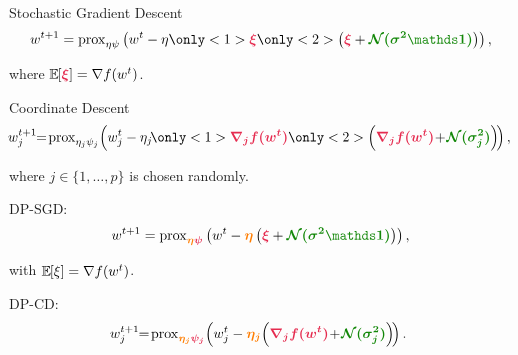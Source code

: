 \documentclass{beamer}
\begin{document}
\begin{frame}
  \vspace{2em}

  Stochastic Gradient Descent
  \begin{align*}
    w^{t+1} = \prox_{\eta\psi}\left(w^t - \eta
    \only<1>{\emphcol{\xi}}
    \only<2>{\left( \emphcol{\xi} + \emphcolb{\cN(\sigma^2\bbI)} \right)}\right),
  \end{align*}

  where $\expec{}{\emphcol{\xi}} = \nabla f(w^t)$.

  \vspace{-0.5em}
\end{frame}


\begin{frame}
  \vspace{2em}

  Coordinate Descent
  \begin{align*}
    \!w^{t+1}_{j}\!\! =\!
    \prox_{\eta_j\psi_j}\!
    \left(w^t_{j} - \eta_{j}\!
    \only<1>{ \emphcol{\nabla_{j} f(w^t)} }
    \only<2>{ \left( \emphcol{\nabla_{j} f(w^t)}
    \!+\! \emphcolb{\cN(\sigma_{j}^2)} \right) \! }\right),
  \end{align*}

  \vspace{1.5em}

  \begin{flushright}
    where $j \in \{1, \dots, p\}$ is chosen randomly.
  \end{flushright}

\end{frame}

\begin{frame}
  DP-SGD:
  \begin{align*}
    w^{t+1} = \prox_{\emphcolc{\eta}\emphcol{\psi}}\left(w^t - \emphcolc{\eta} \left( \emphcol{\xi}
    + \emphcolb{\cN(\sigma^2\bbI)} \right)\right),
  \end{align*}

  \begin{flushright}
    with $\mathbb E_{} \hspace{-0.29em} \left[ \xi \right] = \nabla f(w^t)$.
  \end{flushright}

  DP-CD:
  \begin{align*}
    \!\!w^{t+1}_{j}\!\! =\!
    \prox_{\emphcolc{\eta_j}\emphcol{\psi_j}}\!
    \left(w^t_{j} - \emphcolc{\eta_{j}}\!
    \left( \emphcol{\nabla_{j} f(w^t)}
    \!+\! \emphcolb{\cN(\sigma_{j}^2)} \right)\!\right).
  \end{align*}
\end{frame}
\end{document}
